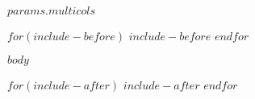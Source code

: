 \documentclass[
$if(fontsize)$
$fontsize$,
$endif$
a4paper, landscape]{article}
\newcommand{\numbermulticols}{$params.multicols$}
\newcommand{\numbermulticols}{3}
\begin{document}

\footnotesize

\begin{multicols*}{\numbermulticols}

\raggedcolumns


\setlength{\premulticols}{0.25pt}
\setlength{\postmulticols}{0.25pt}
\setlength{\multicolsep}{0.25pt}
\setlength{\columnsep}{2mm}


$for(include-before)$
  $include-before$
$endfor$

$body$

\end{multicols*}


$for(include-after)$
  $include-after$
$endfor$
\end{document}
